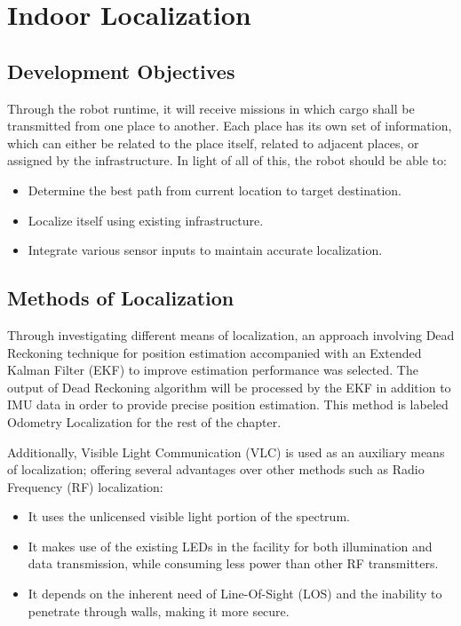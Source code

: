 \chapter{Indoor Localization}
\label{ch:loc}
\section{Development Objectives}
Through the robot runtime, it will receive missions in which cargo shall be transmitted from one place to another. Each place has its own set of information, which can either be related to the place itself, related to adjacent places, or assigned by the infrastructure. In light of all of this, the robot should be able to:
\begin{itemize}
	\item Determine the best path from current location to target destination.
	\item Localize itself using existing infrastructure.
	\item Integrate various sensor inputs to maintain accurate localization.
\end{itemize}

\section{Methods of Localization}
Through investigating different means of localization, an approach involving Dead Reckoning technique for position estimation accompanied with an Extended Kalman Filter (EKF) to improve estimation performance was selected. The output of Dead Reckoning algorithm will be processed by the EKF in addition to IMU data in order to provide precise position estimation. This method is labeled Odometry Localization for the rest of the chapter.

Additionally, Visible Light Communication (VLC) is used as an auxiliary means of localization; offering several advantages over other methods such as Radio Frequency (RF) localization:

\begin{itemize}
	\item It uses the unlicensed visible light portion of the spectrum.
	\item It makes use of the existing LEDs in the facility for both illumination and data transmission, while consuming less power than other RF transmitters.
	\item It depends on the inherent need of Line-Of-Sight (LOS) and the inability to penetrate through walls, making it more secure.
\end{itemize}

